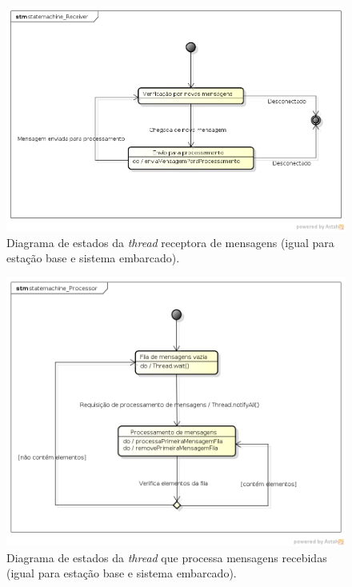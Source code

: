 \begin{figure}[H]
  \centering
  \includegraphics[width=\textwidth, keepaspectratio]{./figuras/statemachine_Receiver.png}
  \caption{Diagrama de estados da \textit{thread} receptora de mensagens (igual para estação base e sistema embarcado).}
  \label{fig:diagrama_estados_receiver}
\end{figure}

\begin{figure}[H]
  \centering
  \includegraphics[width=\textwidth, keepaspectratio]{./figuras/statemachine_Processor.png}
  \caption{Diagrama de estados da \textit{thread} que processa mensagens recebidas (igual para estação base e sistema embarcado).}
  \label{fig:diagrama_estados_processor}
\end{figure}

